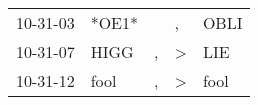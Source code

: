 \begin{supertabular}{p{0.07\textwidth}p{0.06\textwidth}p{0.02\textwidth}p{0.02\textwidth}p{0.06\textwidth}}
 10-31-03\textsuperscript{} &                   *OE1* &    &             , &  OBLI\textsuperscript{} \\
 10-31-07\textsuperscript{} &  HIGG\textsuperscript{} &  , &  \textgreater &   LIE\textsuperscript{} \\
 10-31-12\textsuperscript{} &  fool\textsuperscript{} &  , &  \textgreater &  fool\textsuperscript{} \\
\end{supertabular}

